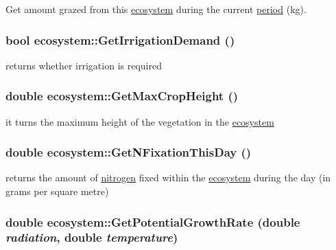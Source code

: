 Get amount grazed from this \hyperlink{classecosystem}{ecosystem} during the current \hyperlink{classperiod}{period} (kg). \hypertarget{classecosystem_a724c7931285236c1d1f0a55ce17b8295}{
\subsubsection[{GetIrrigationDemand}]{\setlength{\rightskip}{0pt plus 5cm}bool ecosystem::GetIrrigationDemand ()}}
\label{classecosystem_a724c7931285236c1d1f0a55ce17b8295}


returns whether irrigation is required \hypertarget{classecosystem_a10bf498ff7059db7f8a37a057e8924c4}{
\subsubsection[{GetMaxCropHeight}]{\setlength{\rightskip}{0pt plus 5cm}double ecosystem::GetMaxCropHeight ()}}
\label{classecosystem_a10bf498ff7059db7f8a37a057e8924c4}


it turns the maximum height of the vegetation in the \hyperlink{classecosystem}{ecosystem} \hypertarget{classecosystem_a3dbc48b9f16c1e7e0b8f6aa7aef3ea83}{
\subsubsection[{GetNFixationThisDay}]{\setlength{\rightskip}{0pt plus 5cm}double ecosystem::GetNFixationThisDay ()}}
\label{classecosystem_a3dbc48b9f16c1e7e0b8f6aa7aef3ea83}


returns the amount of \hyperlink{classnitrogen}{nitrogen} fixed within the \hyperlink{classecosystem}{ecosystem} during the day (in grams per square metre) \hypertarget{classecosystem_a132f9c1d410dd62f121e7ec0bd0e8d88}{
\subsubsection[{GetPotentialGrowthRate}]{\setlength{\rightskip}{0pt plus 5cm}double ecosystem::GetPotentialGrowthRate (double {\em radiation}, \/  double {\em temperature})}}
\label{classecosystem_a132f9c1d410dd62f121e7ec0bd0e8d88}


